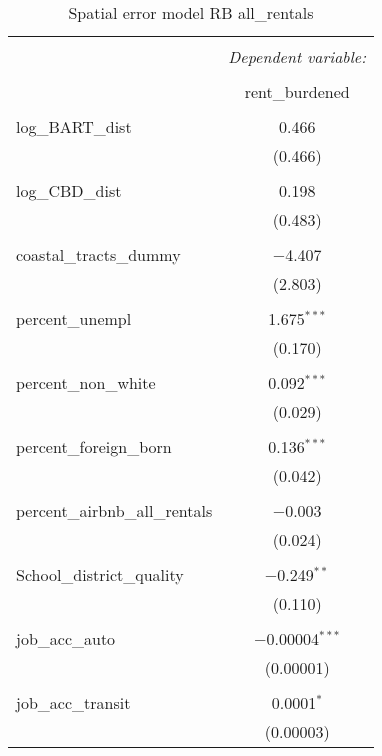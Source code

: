 \documentclass[10pt, letterpaper]{amsart}
\begin{document}
\begin{table}[H] \centering 
  \caption{Spatial error model RB all\_rentals} 
  \label{} 
  \begin{tabular}{@{\extracolsep{5pt}}lc} 
    \\[-1.8ex]\hline 
    \hline \\[-1.8ex] 
    & \multicolumn{1}{c}{\textit{Dependent variable:}} \\ 
    \cline{2-2} 
    \\[-1.8ex] & rent\_burdened \\ 
    \hline \\[-1.8ex] 
    log\_BART\_dist & 0.466 \\ 
    & (0.466) \\ 
    & \\ 
    log\_CBD\_dist & 0.198 \\ 
    & (0.483) \\ 
    & \\ 
    coastal\_tracts\_dummy & $-$4.407 \\ 
    & (2.803) \\ 
    & \\ 
    percent\_unempl & 1.675$^{***}$ \\ 
    & (0.170) \\ 
    & \\ 
    percent\_non\_white & 0.092$^{***}$ \\ 
    & (0.029) \\ 
    & \\ 
    percent\_foreign\_born & 0.136$^{***}$ \\ 
    & (0.042) \\ 
    & \\ 
    percent\_airbnb\_all\_rentals & $-$0.003 \\ 
    & (0.024) \\ 
    & \\ 
    School\_district\_quality & $-$0.249$^{**}$ \\ 
    & (0.110) \\ 
    & \\ 
    job\_acc\_auto & $-$0.00004$^{***}$ \\ 
    & (0.00001) \\ 
    & \\ 
    job\_acc\_transit & 0.0001$^{*}$ \\ 
    & (0.00003) \\ 

\end{tabular}
\end{table}
\end{document}
